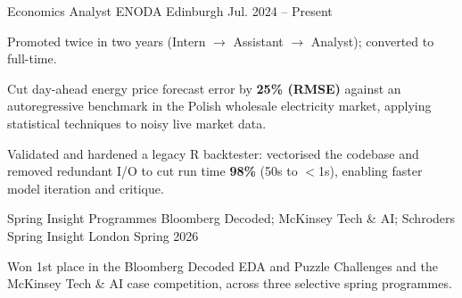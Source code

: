 

\begin{cventries}

  \cventry
    {Economics Analyst} %
    {ENODA} %
    {Edinburgh} %
    {Jul. 2024 -- Present} %
    {
      \begin{cvitems}
        \item {Promoted twice in two years (Intern $\to$ Assistant $\to$ Analyst); converted to full-time.}
        \item {Cut day-ahead energy price forecast error by \textbf{25\% (RMSE)} against an autoregressive benchmark in the Polish wholesale electricity market, applying statistical techniques to noisy live market data.}
        \item {Validated and hardened a legacy R backtester: vectorised the codebase and removed redundant I/O to cut run time \textbf{98\%} (50s to $<$1s), enabling faster model iteration and critique.}
      \end{cvitems}
    }

  \cventry
    {Spring Insight Programmes} %
    {Bloomberg Decoded; McKinsey Tech \& AI; Schroders Spring Insight} %
    {London} %
    {Spring 2026} %
    {
      \begin{cvitems}
        \item {Won 1st place in the Bloomberg Decoded EDA and Puzzle Challenges and the McKinsey Tech \& AI case competition, across three selective spring programmes.}
      \end{cvitems}
    }


\end{cventries}

